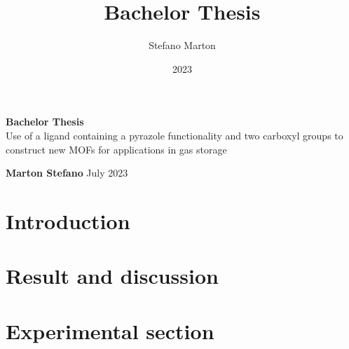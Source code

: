 \documentclass[a4,11pt]{report}
\title{Bachelor Thesis}
\author{Stefano Marton}
\date{2023}
\begin{document}
\begin{titlepage}
	\begin{center}
		\vspace*{6cm}
		\Huge
		\textbf{Bachelor Thesis}\\
		\vspace{0.5cm}
		\LARGE
		\vspace{1.5cm}
		Use of a ligand containing a pyrazole functionality and two carboxyl groups to construct new MOFs for applications in gas storage

		\vspace{1.5cm}
		\textbf{Marton Stefano}
		\vfill
		July 2023
		\vspace{0.8cm}
	\end{center}
\end{titlepage}
\tableofcontents

\chapter{Introduction}


\chapter{Result and discussion}


\chapter{Experimental section}

\end{document}
